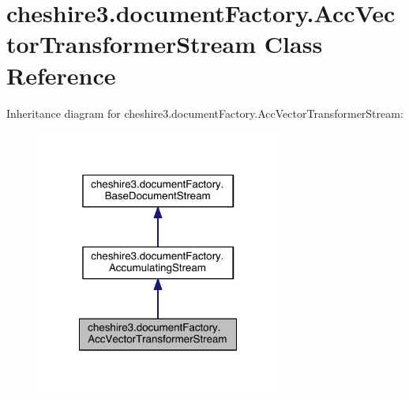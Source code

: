 \hypertarget{classcheshire3_1_1document_factory_1_1_acc_vector_transformer_stream}{\section{cheshire3.\-document\-Factory.\-Acc\-Vector\-Transformer\-Stream Class Reference}
\label{classcheshire3_1_1document_factory_1_1_acc_vector_transformer_stream}
}


Inheritance diagram for cheshire3.\-document\-Factory.\-Acc\-Vector\-Transformer\-Stream\-:
\nopagebreak
\begin{figure}[H]
\begin{center}
\leavevmode
\includegraphics[width=228pt]{classcheshire3_1_1document_factory_1_1_acc_vector_transformer_stream__inherit__graph}
\end{center}
\end{figure}


